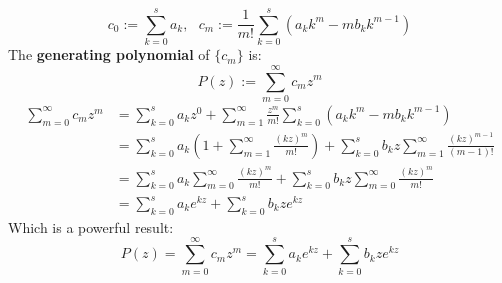 \documentclass[a4paper, 11pt]{article}
\begin{document}
$$
c_0 := \sum_{k=0}^s a_k,~~~c_m := \frac{1}{m!}\sum_{k=0}^s (a_k k^m - mb_k k^{m-1})
$$
The \textbf{generating polynomial} of $\{c_m\}$ is:
$$
P(z) := \sum_{m=0}^{\infty} c_m z^m
$$
\begin{equation}
	\begin{split}
		\sum_{m=0}^{\infty} c_m z^m &=  \sum_{k=0}^s a_k z^0 + \sum_{m=1}^{\infty}\frac{z^m}{m!}\sum_{k=0}^s (a_k k^m - mb_k k^{m-1})  \\
		&= \sum_{k=0}^s a_k \left(1+\sum_{m=1}^{\infty}\frac{(kz)^m}{m!}\right) + \sum_{k=0}^s b_k z\sum_{m=1}^{\infty}\frac{(kz)^{m-1}}{(m-1)!}\\
		&= \sum_{k=0}^s a_k \sum_{m=0}^{\infty}\frac{(kz)^m}{m!}+ \sum_{k=0}^s b_k z\sum_{m=0}^{\infty}\frac{(kz)^{m}}{m!} \\
		&= \sum_{k=0}^s a_k e^{kz}+ \sum_{k=0}^s b_k z e^{kz}
	\end{split}
\end{equation}
Which is a powerful result:
$$
P(z) = \sum_{m=0}^{\infty} c_m z^m = \sum_{k=0}^s a_k e^{kz}+ \sum_{k=0}^s b_k z e^{kz}
$$
\end{document}
